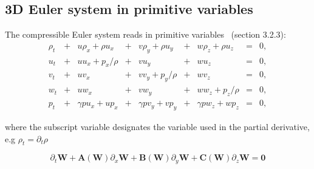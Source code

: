 \documentclass{article}
\begin{document}
\subsection*{3D Euler system in primitive variables}
The compressible Euler system reads in primitive variables~\cite{toro} (section 3.2.3):\\

\begin{equation}
  \begin{array}{ccccccccc}
    \rho_t & + & u\rho_x+\rho u_x & + & v\rho_y+\rho u_y & + & w\rho_z+\rho u_z & = &0,\\
    u_t    & + & u u_x + p_x/\rho & + & v u_y            & + & w u_z            & = &0,\\
    v_t    & + & u v_x            & + & v v_y + p_y/\rho & + & w v_z            & = &0,\\
    w_t    & + & u w_x            & + & v w_y            & + & w w_z + p_z/\rho & = &0,\\
    p_t    & + & \gamma p u_x + u p_x & + & \gamma p v_y + v p_y & + & \gamma p w_z + w p_z & = &0,
  \end{array}
\end{equation}

where the subscript variable designates the variable used in the partial derivative, e.g $\rho_t = \partial_t \rho$

\begin{equation}
  \partial_t \mathbf{W} + \mathbf{A(W)} \partial_x \mathbf{W} + \mathbf{B(W)} \partial_y \mathbf{W} + \mathbf{C(W)} \partial_z \mathbf{W} = \mathbf{0}
\end{equation}
\end{document}
